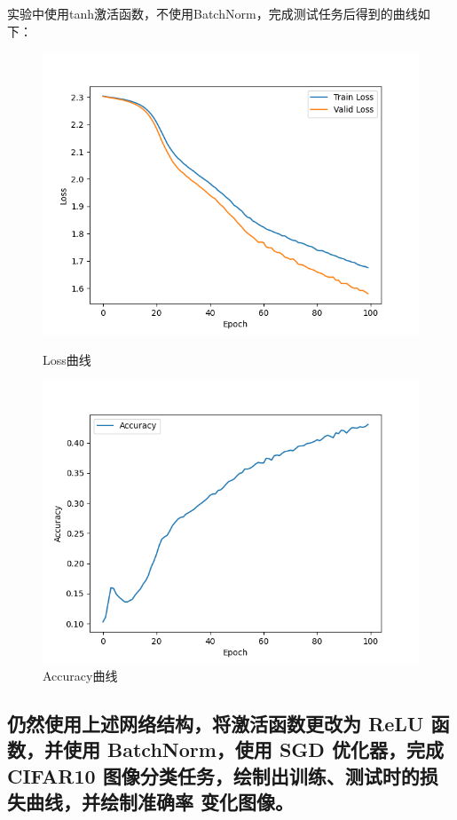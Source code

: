 \documentclass{article}%
\begin{document}
实验中使用tanh激活函数，不使用BatchNorm，完成测试任务后得到的曲线如下：
\begin{figure}[H]
    \centering
    \begin{minipage}{0.49\linewidth}
        \centering
        \includegraphics[width=0.9\linewidth]{Loss_1.png}
        \caption{Loss曲线}
    \end{minipage}
    \begin{minipage}{0.49\linewidth}
        \centering
        \includegraphics[width=0.9\linewidth]{Acc_1.png}
        \caption{Accuracy曲线}
    \end{minipage}
\end{figure}

\subsection{仍然使用上述网络结构，将激活函数更改为 ReLU 函数，并使用 BatchNorm，使用 SGD
优化器，完成 CIFAR10 图像分类任务，绘制出训练、测试时的损失曲线，并绘制准确率
变化图像。}
\end{document}
